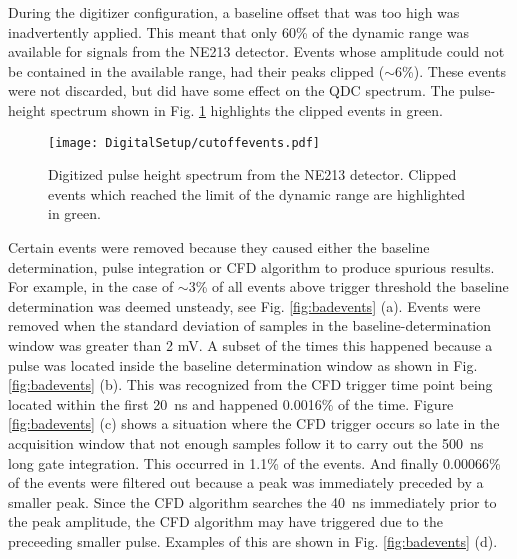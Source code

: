\documentclass[main.tex]{subfiles}
\begin{document}
During the digitizer configuration, a baseline offset that was too high was inadvertently applied. This meant that only 60\% of the dynamic range was available for signals from the NE213 detector. Events whose amplitude could not be contained in the available range, had their peaks clipped ($\sim$6\%). These events were not discarded, but did have some effect on the QDC spectrum. The pulse-height spectrum shown in Fig. \ref{fig:cutoffevents} highlights the clipped events in green.
\begin{figure}[hb!]
    \centering
        \texttt{[image: DigitalSetup/cutoffevents.pdf]}
        \caption[Digitized pulse-height spectrum]{Digitized pulse height spectrum from the NE213 detector. Clipped events which reached the limit of the dynamic range are highlighted in green.}
    \label{fig:cutoffevents} 
\end{figure}

Certain events were removed because they caused either the baseline determination, pulse integration or CFD algorithm to produce spurious results. For example, in the case of $\sim$3\% of all events above trigger threshold the baseline determination was deemed unsteady, see Fig. \ref{fig:badevents} (a). Events were removed when the standard deviation of samples in the baseline-determination window was greater than 2 mV. A subset of the times this happened because a pulse was located inside the baseline determination window as shown in Fig. \ref{fig:badevents} (b). This was recognized from the CFD trigger time point being located within the first \SI{20}{ns} and happened 0.0016\% of the time. Figure \ref{fig:badevents} (c) shows a situation where the CFD trigger occurs so late in the acquisition window that not enough samples follow it to carry out the \SI{500}{\nano\second} long gate integration. This occurred in 1.1\% of the events. And finally 0.00066\% of the events were filtered out because a peak was immediately  preceded by a smaller peak. Since the CFD algorithm searches the \SI{40}{ns} immediately prior to the peak amplitude, the CFD algorithm may have triggered due to the preceeding smaller pulse. Examples of this are shown in Fig. \ref{fig:badevents} (d).
\end{document}
